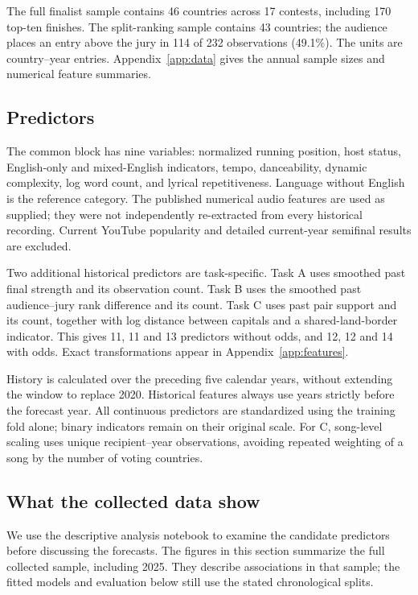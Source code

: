 \documentclass[11pt,a4paper]{article}
\begin{document}
The full finalist sample contains 46 countries across 17 contests, including 170 top-ten finishes. The split-ranking sample contains 43 countries; the audience places an entry above the jury in 114 of 232 observations (49.1\%). The units are country--year entries. Appendix~\ref{app:data} gives the annual sample sizes and numerical feature summaries.

\subsection{Predictors}
The common block has nine variables: normalized running position, host status, English-only and mixed-English indicators, tempo, danceability, dynamic complexity, log word count, and lyrical repetitiveness. Language without English is the reference category. The published numerical audio features are used as supplied; they were not independently re-extracted from every historical recording. Current YouTube popularity and detailed current-year semifinal results are excluded.

Two additional historical predictors are task-specific. Task A uses smoothed past final strength and its observation count. Task B uses the smoothed past audience--jury rank difference and its count. Task C uses past pair support and its count, together with log distance between capitals and a shared-land-border indicator. This gives 11, 11 and 13 predictors without odds, and 12, 12 and 14 with odds. Exact transformations appear in Appendix~\ref{app:features}.

History is calculated over the preceding five calendar years, without extending the window to replace 2020. Historical features always use years strictly before the forecast year. All continuous predictors are standardized using the training fold alone; binary indicators remain on their original scale. For C, song-level scaling uses unique recipient--year observations, avoiding repeated weighting of a song by the number of voting countries.

\subsection{What the collected data show}\label{sec:eda}
We use the descriptive analysis notebook to examine the candidate predictors before discussing the forecasts. The figures in this section summarize the full collected sample, including 2025. They describe associations in that sample; the fitted models and evaluation below still use the stated chronological splits.
\end{document}
